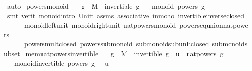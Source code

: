 \begin{isabellebody}
\ auto\isanewline
{}\isamarkupfalse%
%
\endisatagproof
{\isafoldproof}%
%
\isadelimproof
\isanewline
%
\endisadelimproof
\isanewline
{}\isamarkupfalse%
\ powers{\isacharunderscore}{\kern0pt}monoid{\isacharcolon}{\kern0pt}\isanewline
\ \ \ {\isachardoublequoteopen}g\ {\isasymin}\ M{\isachardoublequoteclose}\ \ {\isachardoublequoteopen}invertible\ g{\isachardoublequoteclose}\isanewline
\ \ \ {\isachardoublequoteopen}monoid\ {\isacharparenleft}{\kern0pt}powers\ g{\isacharparenright}{\kern0pt}\ {\isacharparenleft}{\kern0pt}{\isasymcdot}{\isacharparenright}{\kern0pt}\ {\isasymone}{\isachardoublequoteclose}\isanewline
%
\isadelimproof
\ \ %
\endisadelimproof
%
\isatagproof
{}\isamarkupfalse%
\ {\isacharparenleft}{\kern0pt}smt\ {\isacharparenleft}{\kern0pt}verit{\isacharparenright}{\kern0pt}\ monoid{\isachardot}{\kern0pt}intro\ Un{\isacharunderscore}{\kern0pt}iff\ assms\ associative\ in{\isacharunderscore}{\kern0pt}mono\ invertible{\isacharunderscore}{\kern0pt}inverse{\isacharunderscore}{\kern0pt}closed\ \isanewline
\ \ \ \ \ \ monoid{\isachardot}{\kern0pt}left{\isacharunderscore}{\kern0pt}unit\ monoid{\isachardot}{\kern0pt}right{\isacharunderscore}{\kern0pt}unit\ nat{\isacharunderscore}{\kern0pt}powers{\isacharunderscore}{\kern0pt}monoid\ powers{\isacharunderscore}{\kern0pt}eq{\isacharunderscore}{\kern0pt}union{\isacharunderscore}{\kern0pt}nat{\isacharunderscore}{\kern0pt}powers\ \isanewline
\ \ \ \ \ \ powers{\isacharunderscore}{\kern0pt}mult{\isacharunderscore}{\kern0pt}closed\ powers{\isacharunderscore}{\kern0pt}submonoid\ submonoid{\isachardot}{\kern0pt}sub{\isacharunderscore}{\kern0pt}unit{\isacharunderscore}{\kern0pt}closed\ submonoid{\isachardot}{\kern0pt}subset{\isacharparenright}{\kern0pt}%
\endisatagproof
{\isafoldproof}%
%
\isadelimproof
\isanewline
%
\endisadelimproof
\isanewline
{}\isamarkupfalse%
\ mem{\isacharunderscore}{\kern0pt}nat{\isacharunderscore}{\kern0pt}powers{\isacharunderscore}{\kern0pt}invertible{\isacharcolon}{\kern0pt}\isanewline
\ \ \ {\isachardoublequoteopen}g\ {\isasymin}\ M{\isachardoublequoteclose}\ \ {\isachardoublequoteopen}invertible\ g{\isachardoublequoteclose}\ \ {\isachardoublequoteopen}u\ {\isasymin}\ nat{\isacharunderscore}{\kern0pt}powers\ g{\isachardoublequoteclose}\isanewline
\ \ \ {\isachardoublequoteopen}monoid{\isachardot}{\kern0pt}invertible\ {\isacharparenleft}{\kern0pt}powers\ g{\isacharparenright}{\kern0pt}\ {\isacharparenleft}{\kern0pt}{\isasymcdot}{\isacharparenright}{\kern0pt}\ {\isasymone}\ u{\isachardoublequoteclose}\isanewline

\end{isabellebody}
